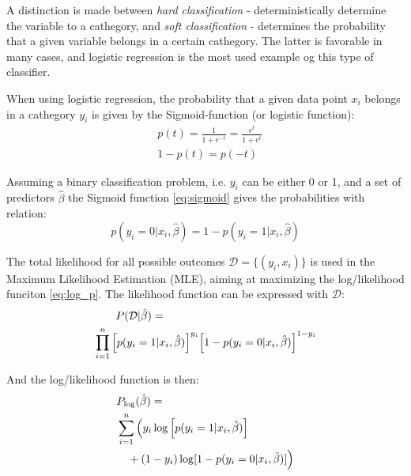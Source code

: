 A distinction is made between \textit{hard classification} - deterministically determine the variable to a cathegory, and \textit{soft classification} - determines the probability that a given variable belongs in a certain cathegory. The latter is favorable in many cases, and logistic regression is the most used example og this type of classifier.

When using logistic regression, the probability that a given data point $x_i$ belongs in a cathegory $y_i$ is given by the Sigmoid-function (or logistic function):
\begin{equation}
\begin{split}
    & p(t) = \frac{1}{1 + e^{-t}} = \frac{e^t}{1+e^t} \\
    & 1-p(t) = p(-t)
\end{split}
  \label{eq:sigmoid}
\end{equation}

Assuming a binary classification problem, i.e. $y_i$ can be either 0 or 1, and a set of predictors $\hat{\beta}$ the Sigmoid function \eqref{eq:sigmoid} gives the probabilities with relation:
\begin{equation*}
  p(y_i = 0|x_i,\hat{\beta})  = 1 - p(y_i = 1|x_i,\hat{\beta})
  \label{eq:prob_relation}
\end{equation*}

The total likelihood for all possible outcomes $\mathcal{D}=\{(y_i,x_i)\}$ is used in the Maximum Likelihood Estimation (MLE), aiming at maximizing the log/likelihood funciton \eqref{eq:log_p}. The likelihood function can be expressed with $\mathcal{D}$:
\begin{equation*}
\begin{split}
    &\qquad P(\mathcal{D}|\hat{\beta}) = \\
    &\prod_{i=1}^n \qty[p(y_i = 1|x_i,\hat{\beta}) ]^{y_i}  \qty[1 - p(y_i = 0|x_i,\hat{\beta})]^{1-y_i}
\end{split}
\end{equation*}

And the log/likelihood function is then:
\begin{equation}
\begin{split}
    &P_{\log}(\hat{\beta}) = \\
    &\sum_{i=1}^n \Big(y_i \log \qty[p(y_i = 1|x_i,\hat{\beta})] \\
    &\quad+ (1-y_i) \log [1 - p(y_i = 0|x_i,\hat{\beta})]\Big)
\end{split}
\label{eq:log_p}
\end{equation}

